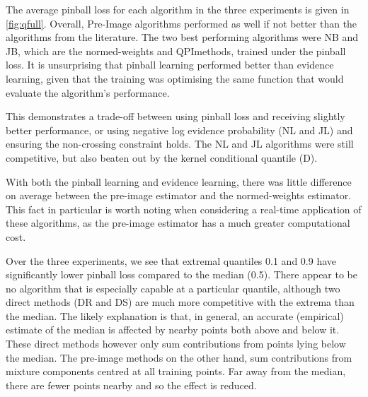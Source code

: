 \documentclass[twoside]{article} \usepackage{aistats2017}
\theoremstyle{definition}
\theoremstyle{theorem}
\newcommand{\qpi}{QPI}
\begin{document}
		
		
		The average pinball loss for each algorithm in the three experiments is given in \cref{fig:qfull}. Overall, Pre-Image algorithms performed as well if not better than the algorithms from the literature. The two best performing algorithms were NB and JB, which are the normed-weights and \qpi methods, trained under the pinball loss. It is unsurprising that pinball learning performed better than evidence learning, given that the training was optimising the same function that would evaluate the algorithm's performance.

		This demonstrates a trade-off between using pinball loss and receiving slightly better performance, or using negative log evidence probability (NL and JL) and ensuring the non-crossing constraint holds. The NL and JL algorithms were still competitive, but also beaten out by the kernel conditional quantile (D).

		With both the pinball learning and evidence learning, there was little difference on average between the pre-image estimator and the normed-weights estimator. This fact in particular is worth noting when considering a real-time application of these algorithms, as the pre-image estimator has a much greater computational cost.
		
		Over the three experiments, we see that extremal quantiles 0.1 and 0.9 have significantly lower pinball loss compared to the median (0.5). There appear to be no algorithm that is especially capable at a particular quantile, although two direct methods (DR and DS) are much more competitive with the extrema than the median. The likely explanation is that, in general, an accurate (empirical) estimate of the median is affected by nearby points both above and below it. These direct methods however only sum contributions from points lying below the median. The pre-image methods on the other hand, sum contributions from mixture components centred at all training points. Far away from the median, there are fewer points nearby and so the effect is reduced.
		
\end{document}
